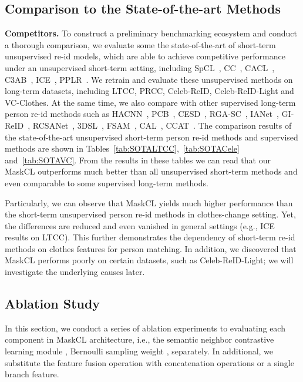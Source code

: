 \documentclass[10pt,twocolumn,letterpaper]{article}
\newcommand{\reid}{re-id}
\newcommand{\sota}{the state-of-the-art}
\newcommand{\myparagraph}[1]{\noindent\textbf{#1.}}
\def\ie{i.e.}
\def\eg{e.g.}
\begin{document}
\subsection{Comparison to the State-of-the-art Methods} 
\label{subsec:comp-to-sota}

\myparagraph{Competitors}
\label{p:baselines}
To construct a preliminary benchmarking ecosystem and conduct a thorough comparison, we evaluate some \sota{} of short-term unsupervised \reid{} models, which are able to achieve competitive performance under an unsupervised short-term setting, including SpCL~\cite{Ge:NIPS20}, CC~\cite{tanping:arxiv2020}, CACL~\cite{TIPlmk}, C3AB~\cite{lmkpr}, ICE~\cite{ICE}, PPLR~\cite{PPLR}.
We retrain and evaluate these unsupervised methods on long-term datasets, including LTCC, PRCC, Celeb-ReID, Celeb-ReID-Light and VC-Clothes. 
At the same time, we also compare with other supervised long-term person \reid{} methods such as HACNN~\cite{li:HACNNCVPR18}, PCB~\cite{sun:PCBECCV18}, CESD~\cite{qian:CESDACCV20}, RGA-SC~\cite{zhang:RGASCCVPR20}, IANet~\cite{hou:IANETCVPR19}, GI-ReID~\cite{jin:GI-ReIDCVPR22}, RCSANet~\cite{huang:RCSANetCVPR21}, 3DSL~\cite{chen:3DSLCVPR21}, FSAM~\cite{hong:FSAMCVPR21}, CAL~\cite{CCgu:CVPR22}, CCAT~\cite{ren:CCATIJCNN22}. 
The comparison results of the state-of-the-art unsupervised short-term  person \reid{} methods and supervised methods are shown in Tables~\ref{tab:SOTALTCC},~\ref{tab:SOTACele} and~\ref{tab:SOTAVC}.
From the results in these tables we can read that our MaskCL outperforms much better than all unsupervised short-term methods and even comparable to some supervised long-term methods.













Particularly, we can observe that MaskCL yields much higher performance than the short-term unsupervised person re-id methods in clothes-change setting. Yet, the differences are reduced and even vanished in general settings (\eg, ICE results on LTCC).  This further demonstrates the dependency of short-term re-id methods on clothes features for person matching. 
In addition, we discovered that MaskCL performs poorly on certain datasets, such as Celeb-ReID-Light; we will investigate the underlying causes later.


\subsection{Ablation Study}
In this section, we conduct a series of ablation experiments to evaluating each component in MaskCL architecture, \ie, the semantic neighbor contrastive learning module ,  Bernoulli sampling weight , separately.
In additional, we substitute the feature fusion operation with concatenation operations or a single branch feature. 
\end{document}

